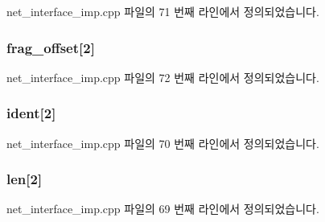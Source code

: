 net\+\_\+interface\+\_\+imp.\+cpp 파일의 71 번째 라인에서 정의되었습니다.

\subsubsection[{\texorpdfstring{frag\+\_\+offset}{frag_offset}}]{ frag\+\_\+offset\mbox{[}2\mbox{]}}\hypertarget{structavdecc__lib_1_1ipheader_accc8336ef12f5a770d6ff178306aa4d0}{}\label{structavdecc__lib_1_1ipheader_accc8336ef12f5a770d6ff178306aa4d0}


net\+\_\+interface\+\_\+imp.\+cpp 파일의 72 번째 라인에서 정의되었습니다.

\subsubsection[{\texorpdfstring{ident}{ident}}]{ ident\mbox{[}2\mbox{]}}\hypertarget{structavdecc__lib_1_1ipheader_a405d1e93ea88f8867d4433421f739d90}{}\label{structavdecc__lib_1_1ipheader_a405d1e93ea88f8867d4433421f739d90}


net\+\_\+interface\+\_\+imp.\+cpp 파일의 70 번째 라인에서 정의되었습니다.

\subsubsection[{\texorpdfstring{len}{len}}]{ len\mbox{[}2\mbox{]}}\hypertarget{structavdecc__lib_1_1ipheader_a1f4db4ef2eda0f20fc4dd5cbff93c7be}{}\label{structavdecc__lib_1_1ipheader_a1f4db4ef2eda0f20fc4dd5cbff93c7be}


net\+\_\+interface\+\_\+imp.\+cpp 파일의 69 번째 라인에서 정의되었습니다.

